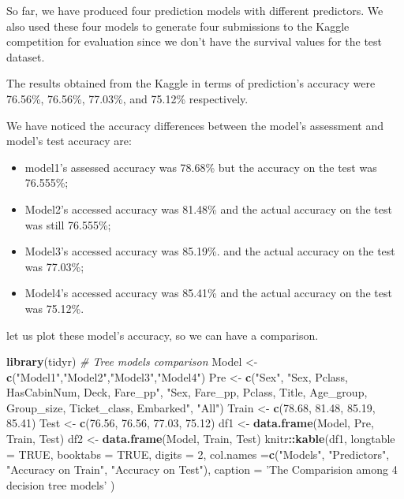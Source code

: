 \documentclass[
]{book}
\newenvironment{Shaded}{\begin{snugshade}}{\end{snugshade}}
\newcommand{\CommentTok}[1]{\textcolor[rgb]{0.56,0.35,0.01}{\textit{#1}}}
\newcommand{\DataTypeTok}[1]{\textcolor[rgb]{0.13,0.29,0.53}{#1}}
\newcommand{\DecValTok}[1]{\textcolor[rgb]{0.00,0.00,0.81}{#1}}
\newcommand{\FloatTok}[1]{\textcolor[rgb]{0.00,0.00,0.81}{#1}}
\newcommand{\KeywordTok}[1]{\textcolor[rgb]{0.13,0.29,0.53}{\textbf{#1}}}
\newcommand{\NormalTok}[1]{#1}
\newcommand{\OperatorTok}[1]{\textcolor[rgb]{0.81,0.36,0.00}{\textbf{#1}}}
\newcommand{\OtherTok}[1]{\textcolor[rgb]{0.56,0.35,0.01}{#1}}
\newcommand{\StringTok}[1]{\textcolor[rgb]{0.31,0.60,0.02}{#1}}
\begin{document}
So far, we have produced four prediction models with different predictors. We also used these four models to generate four submissions to the Kaggle competition for evaluation since we don't have the survival values for the test dataset.

The results obtained from the Kaggle in terms of prediction's accuracy were 76.56\%, 76.56\%, 77.03\%, and 75.12\% respectively.

We have noticed the accuracy differences between the model's assessment and model's test accuracy are:

\begin{itemize}
\item
  model1's assessed accuracy was 78.68\% but the accuracy on the test was 76.555\%;
\item
  Model2's accessed accuracy was 81.48\% and the actual accuracy on the test was still 76.555\%;
\item
  Model3's accessed accuracy was 85.19\%. and the actual accuracy on the test was 77.03\%;
\item
  Model4's accessed accuracy was 85.41\% and the actual accuracy on the test was 75.12\%.
\end{itemize}

let us plot these model's accuracy, so we can have a comparison.

\begin{Shaded}
\begin{Highlighting}[]
\KeywordTok{library}\NormalTok{(tidyr)}
\CommentTok{# Tree models comparison}
\NormalTok{Model <-}\StringTok{ }\KeywordTok{c}\NormalTok{(}\StringTok{"Model1"}\NormalTok{,}\StringTok{"Model2"}\NormalTok{,}\StringTok{"Model3"}\NormalTok{,}\StringTok{"Model4"}\NormalTok{)}
\NormalTok{Pre <-}\StringTok{ }\KeywordTok{c}\NormalTok{(}\StringTok{"Sex"}\NormalTok{, }\StringTok{"Sex, Pclass, HasCabinNum, Deck, Fare_pp"}\NormalTok{, }\StringTok{"Sex, Fare_pp, Pclass, Title, Age_group, Group_size, Ticket_class, Embarked"}\NormalTok{, }\StringTok{"All"}\NormalTok{)}
\NormalTok{Train <-}\StringTok{ }\KeywordTok{c}\NormalTok{(}\FloatTok{78.68}\NormalTok{, }\FloatTok{81.48}\NormalTok{, }\FloatTok{85.19}\NormalTok{, }\FloatTok{85.41}\NormalTok{)}
\NormalTok{Test <-}\StringTok{ }\KeywordTok{c}\NormalTok{(}\FloatTok{76.56}\NormalTok{, }\FloatTok{76.56}\NormalTok{, }\FloatTok{77.03}\NormalTok{, }\FloatTok{75.12}\NormalTok{)}
\NormalTok{df1 <-}\StringTok{ }\KeywordTok{data.frame}\NormalTok{(Model, Pre, Train, Test)}
\NormalTok{df2 <-}\StringTok{ }\KeywordTok{data.frame}\NormalTok{(Model, Train, Test)}
\NormalTok{knitr}\OperatorTok{::}\KeywordTok{kable}\NormalTok{(df1, }\DataTypeTok{longtable =} \OtherTok{TRUE}\NormalTok{, }\DataTypeTok{booktabs =} \OtherTok{TRUE}\NormalTok{, }\DataTypeTok{digits =} \DecValTok{2}\NormalTok{, }\DataTypeTok{col.names =}\KeywordTok{c}\NormalTok{(}\StringTok{"Models"}\NormalTok{, }\StringTok{"Predictors"}\NormalTok{, }\StringTok{"Accuracy on Train"}\NormalTok{, }\StringTok{"Accuracy on Test"}\NormalTok{), }
  \DataTypeTok{caption =} \StringTok{'The Comparision among 4 decision tree models'}
\NormalTok{)}
\end{Highlighting}
\end{Shaded}
\end{document}
